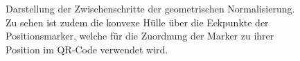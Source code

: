 \documentclass[a4paper, oneside, 12pt]{article}
\begin{document}
\begin{figure}[t]
	\begin{center}
	\end{center}
	\caption{Darstellung der Zwischenschritte der geometrischen Normalisierung. Zu sehen ist zudem die konvexe Hülle über die Eckpunkte der Positionsmarker, welche für die Zuordnung der Marker zu ihrer Position im QR-Code verwendet wird.}
	\label{fig:geometrie}
\end{figure}
\end{document}
